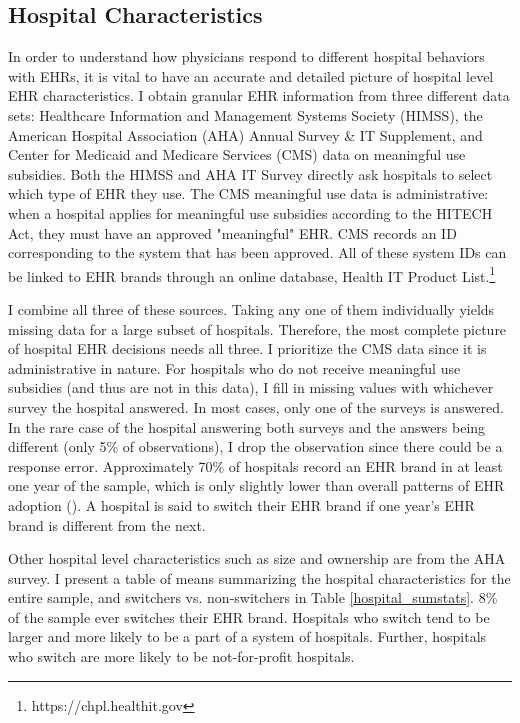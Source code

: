 \documentclass[12pt]{article}
\begin{document}
    \subsection{Hospital Characteristics}\label{subsec:hospital characteristics}

    In order to understand how physicians respond to different hospital behaviors with EHRs, it is vital to have an accurate and detailed picture of hospital level EHR characteristics. I obtain granular EHR information from three different data sets: Healthcare Information and Management Systems Society (HIMSS), the American Hospital Association (AHA) Annual Survey \& IT Supplement, and Center for Medicaid and Medicare Services (CMS) data on meaningful use subsidies. Both the HIMSS and AHA IT Survey directly ask hospitals to select which type of EHR they use. The CMS meaningful use data is administrative: when a hospital applies for meaningful use subsidies according to the HITECH Act, they must have an approved "meaningful" EHR. CMS records an ID corresponding to the system that has been approved. All of these system IDs can be linked to EHR brands through an online database, Health IT Product List.\footnote{https://chpl.healthit.gov} 

    I combine all three of these sources. Taking any one of them individually yields missing data for a large subset of hospitals. Therefore, the most complete picture of hospital EHR decisions needs all three. I prioritize the CMS data since it is administrative in nature. For hospitals who do not receive meaningful use subsidies (and thus are not in this data), I fill in missing values with whichever survey the hospital answered. In most cases, only one of the surveys is answered. In the rare case of the hospital answering both surveys and the answers being different (only 5\% of observations), I drop the observation since there could be a response error. Approximately 70\% of hospitals record an EHR brand in at least one year of the sample, which is only slightly lower than overall patterns of EHR adoption (\cite{healthitstats_2017}). A hospital is said to switch their EHR brand if one year's EHR brand is different from the next. 

    Other hospital level characteristics such as size and ownership are from the AHA survey. I present a table of means summarizing the hospital characteristics for the entire sample, and switchers vs. non-switchers in Table \ref{hospital_sumstats}. 8\% of the sample ever switches their EHR brand. Hospitals who switch tend to be larger and more likely to be a part of a system of hospitals. Further, hospitals who switch are more likely to be not-for-profit hospitals. 
\end{document}
